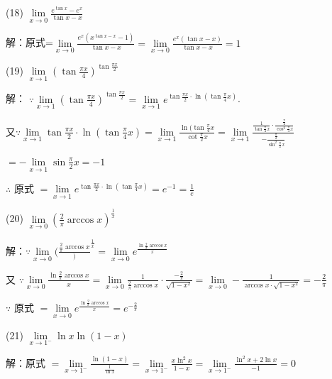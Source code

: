 \documentclass{article}
\begin{document}
\begin{enumerate}[1.]
				(18) $\lim\limits _{x \rightarrow 0} \frac{e^{\tan x}-e^{x}}{\tan x-x}$
				
				解：原式=$\lim\limits _{x \rightarrow 0}\frac{e^x(x^{\tan x-x}-1)}{\tan x-x}=\lim\limits_{x\rightarrow 0}\frac{e^x(\tan x-x)}{\tan x-x}=1$
				
				(19) $\lim\limits _{x \rightarrow 1} \left(\tan \frac{\pi x}{4}\right)^{\tan \frac{\pi x}{2}}$
				
				解： $\because \lim\limits _{x \rightarrow 1}\left(\tan \frac{\pi x}{4}\right)^{\tan \frac{\pi x}{2}}
				=\lim\limits _{x \rightarrow 1} e^{\tan \frac{\pi x}{2}\cdot \ln \left(\tan \frac{\pi}{4} x\right)}$.
				
				又$\because \lim\limits _{x \rightarrow 1} \tan \frac{\pi x}{2}\cdot \ln \left(\tan \frac{\pi}{4} x\right)
				=\lim\limits _{x \rightarrow 1}\frac{\ln (\tan \frac{\pi}{4}x}{\cot \frac{\pi}{2}x}
				=\lim\limits _{x \rightarrow 1}
				\frac{\frac{1}{\tan \frac{\pi}{4}x}\cdot \frac{\frac{\pi}{4}}{\cos ^2\frac{\pi}{4}x}}{-\frac{\frac{\pi}{2}}{\sin ^2\frac{\pi}{2}x}}$
				
				$=-\lim\limits _{x \rightarrow 1} \sin \frac{\pi}{2}x=-1$
				
				$\therefore$ 原式 $=\lim\limits _{x \rightarrow 1}e^{\tan \frac{\pi x}{2}\cdot \ln \left(\tan \frac{\pi}{4} x\right)}=e^{-1}=\frac{1}{e}$
				
				(20) $\lim\limits _{x \rightarrow 0}\left(\frac{2}{\pi} \arccos x\right)^{\frac{1}{x}}$
				
				解：$\because \lim\limits _{x \rightarrow 0} (\frac{\frac{2}{\pi} \arccos x})^{\frac{1}{x}}
				=\lim\limits _{x \rightarrow 0}e^{\frac{\ln \frac{2}{\pi}\arccos x}{x}}$
				
				又 $\because \lim\limits _{x \rightarrow 0}\frac{\ln \frac{2}{\pi}\arccos x}{x}
				=\lim\limits _{x \rightarrow 0} \frac{1}{\frac{2}{\pi}\arccos x} \cdot \frac{-\frac{2}{\pi}}{\sqrt{1-x^{2}}}
				=\lim\limits _{x \rightarrow 0}-\frac{1}{\arccos x \cdot \sqrt{1-x^2}}=-\frac{2}{\pi}$
				
				$\because$ 原式 $=\lim\limits _{x \rightarrow 0}e^{\frac{\ln \frac{2}{\pi}\arccos x}{x}}=e^{-\frac{2}{\pi}}$
				
				(21) $\lim\limits _{x \rightarrow 1^{-}} \ln x \ln (1-x)$
				
				解：原式 $=\lim\limits _{x \rightarrow 1^{-}}\frac{\ln (1-x)}{\frac{1}{\ln x}}
				=\lim\limits _{x \rightarrow 1^{-}}\frac{x\ln^2 x}{1-x}
				=\lim\limits _{x \rightarrow 1^{-}}\frac{\ln^2 x+2\ln x}{-1}=0$
				

\end{enumerate}
\end{document}
